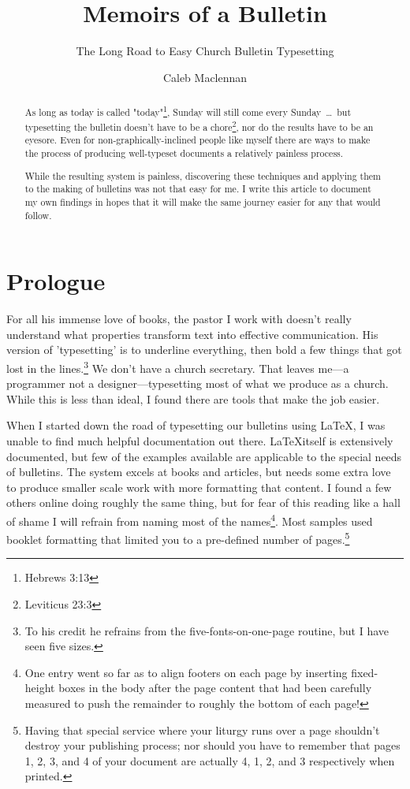\documentclass[12pt]{scrartcl}
\title{Memoirs of a Bulletin}
\subtitle{The Long Road to Easy Church Bulletin Typesetting}
\author{Caleb Maclennan}
\makeatletter
\let\svmaketitle\maketitle
\def\maketitle{\protected@edef\saved@title{\@title}%
	\svmaketitle%
	\let\@title\saved@title}%
\makeatother
\begin{document}
\maketitle

\begin{abstract}

As long as today is called "today"\footnote{Hebrews 3:13}, Sunday will still
come every Sunday~\dots~but typesetting the bulletin doesn't have to be a
chore\footnote{Leviticus 23:3}, nor do the results have to be an eyesore. Even
for non-graphically-inclined people like myself there are ways to make the
process of producing well-typeset documents a relatively painless process.

While the resulting system is painless, discovering these techniques and
applying them to the making of bulletins was not that easy for me. I write this
article to document my own findings in hopes that it will make the same journey
easier for any that would follow.

\end{abstract}

\section*{Prologue}

For all his immense love of books, the pastor I work with doesn't really
understand what properties transform text into effective communication. His
version of 'typesetting' is to underline everything, then bold a few things that
got lost in the lines.\footnote{To his credit he refrains from the
	five-fonts-on-one-page routine, but I have seen five sizes.} We don't
have a church secretary. That leaves me---a programmer not a
designer---typesetting most of what we produce as a church. While this is less
than ideal, I found there are tools that make the job easier.

When I started down the road of typesetting our bulletins using \LaTeX, I was
unable to find much helpful documentation out there. \LaTeX itself is
extensively documented, but few of the examples available are applicable to the
special needs of bulletins. The system excels at books and articles, but needs
some extra love to produce smaller scale work with more formatting that content.
I found a few others online doing roughly the same thing, but for fear of this
reading like a hall of shame I will refrain from naming most of the
names\footnote{One entry went so far as to align footers on each page by
	inserting fixed-height boxes in the body after the page content that had
	been carefully measured to push the remainder to roughly the bottom of
	each page!}.  Most samples used booklet formatting that limited you to a
pre-defined number of pages.\footnote{Having that special service where your
	liturgy runs over a page shouldn't destroy your publishing process; nor
	should you have to remember that pages 1, 2, 3, and 4 of your document
	are actually 4, 1, 2, and 3 respectively when printed.}
\end{document}
